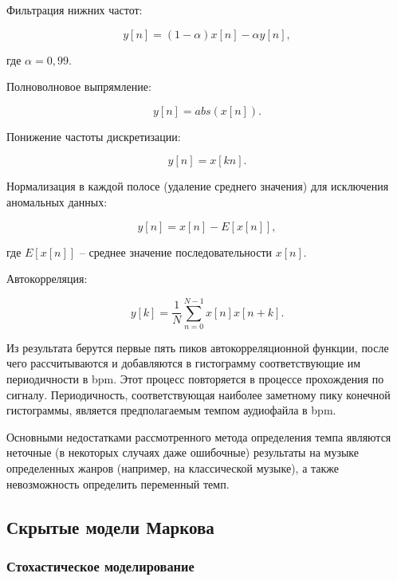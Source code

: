 Фильтрация нижних частот:

\begin{equation}
	y[n] = (1 - \alpha)x[n] - \alpha y[n],
\end{equation}

где $\alpha = 0,99$.

Полноволновое выпрямление:

\begin{equation}
	y[n] = abs(x[n]).
\end{equation}

Понижение частоты дискретизации:

\begin{equation}
	y[n] = x[kn].
\end{equation}

Нормализация в каждой полосе (удаление среднего значения) для исключения аномальных данных:

\begin{equation}
	y[n] = x[n] - E[x[n]],
\end{equation}

где $E[x[n]]$ -- среднее значение последовательности $x[n]$.

Автокорреляция:

\begin{equation}
	y[k] = \frac{1}{N} \sum_{n=0}^{N-1}x[n]x[n+k].
\end{equation}

Из результата берутся первые пять пиков автокорреляционной функции, после чего рассчитываются и добавляются в гистограмму соответствующие им периодичности в bpm. Этот процесс повторяется в процессе прохождения по сигналу. Периодичность, соответствующая наиболее заметному пику конечной гистограммы, является предполагаемым темпом аудиофайла в bpm.

Основными недостатками рассмотренного метода определения темпа являются неточные (в некоторых случаях даже ошибочные) результаты на музыке определенных жанров (например, на классической музыке), а также невозможность определить переменный темп.

\subsection{Скрытые модели Маркова}

\subsubsection{Стохастическое моделирование}

